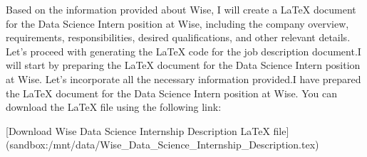 Based on the information provided about Wise, I will create a LaTeX document for the Data Science Intern position at Wise, including the company overview, requirements, responsibilities, desired qualifications, and other relevant details. Let's proceed with generating the LaTeX code for the job description document.I will start by preparing the LaTeX document for the Data Science Intern position at Wise. Let's incorporate all the necessary information provided.I have prepared the LaTeX document for the Data Science Intern position at Wise. You can download the LaTeX file using the following link:

[Download Wise Data Science Internship Description LaTeX file](sandbox:/mnt/data/Wise_Data_Science_Internship_Description.tex)
